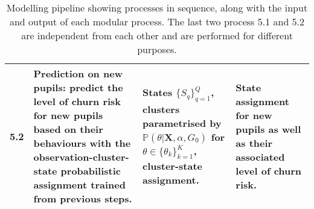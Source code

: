 \begin{table}[!h]
\begin{tabular}{c|p{6cm}|p{3.5cm}|p{3.5cm}}
\hline
5.2 &
\textbf{Prediction on new pupils}: predict the level of churn risk for new pupils based on their behaviours with the observation-cluster-state probabilistic assignment trained from previous steps. &
States $\{S_q\}_{q=1}^Q$, clusters parametrised by $\mathbb{P}(\theta | \mathbf{X}, \alpha, G_0)$ for $\theta \in \{\theta_k\}_{k=1}^K$, cluster-state assignment. & 
State assignment for new pupils as well as their associated level of churn risk. \\
\hline
\end{tabular}
\caption{Modelling pipeline showing processes in sequence, along with the input and output of each modular process. The last two process 5.1 and 5.2 are independent from each other and are performed for different purposes.}
\label{tab:pipeline}
\end{table}